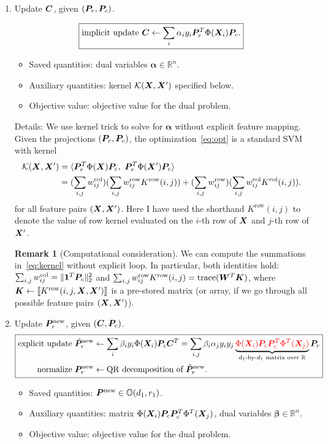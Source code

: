 \documentclass[11pt]{article}
\theoremstyle{plain}
\theoremstyle{definition}
\newtheorem{rmk}{Remark}
\newcommand*{\KeepStyleUnderBrace}[1]{%
  \mathop{%
    \mathchoice
    {\underbrace{\displaystyle#1}}%
    {\underbrace{\textstyle#1}}%
    {\underbrace{\scriptstyle#1}}%
    {\underbrace{\scriptscriptstyle#1}}%
  }\limits
}
\begin{document}
\begin{enumerate}
\item Update $\bm C$, given $(\bm{P}_r, \bm{P}_c)$. 

\[
\boxed{
\text{implicit update }\bm C\leftarrow \sum_{i}\alpha_iy_i\bm{P}^T_r\Phi(\bm X_i)\bm{P}_c.
}
\]
\begin{itemize}
\item Saved quantities: dual variables $\boldsymbol{\alpha}\in\mathbb{R}^n$.
\item Auxiliary  quantities: kernel $\mathcal{K}(\bm X,\bm X')$ specified below.
\item Objective value: objective value for the dual problem. 
\end{itemize}

Details:  We use kernel trick to solve for $\boldsymbol{\alpha}$ without explicit feature mapping. Given the projections $(\bm{P}_r, \bm{P}_c)$, the optimization~\eqref{eq:opt} is a standard SVM with kernel
\begin{align}\label{eq:kernel}
\mathcal{K}(\bm X,\bm X')&=\langle \bm{P}^T_r\Phi(\bm X)\bm{P}_c,\ \bm{P}^T_r\Phi(\bm X')\bm{P}_c\rangle\notag\\
&= (\sum_{i,j}w^{\text{col}}_{ij})( \sum_{i,j} w^{\text{row}}_{ij}K^{\text{row}}(i,j))+(\sum_{i,j}w^{\text{row}}_{ij})( \sum_{i,j} w^{\text{col}}_{ij}K^{\text{col}}(i,j)).
\end{align}
for all feature pairs $(\bm X,\bm X')$. Here I have used the shorthand $K^{\text{row}}(i,j)$ to denote the value of row kernel evaluated on the $i$-th row of $\bm X$ and $j$-th row of $\bm X'$. 

\begin{rmk}[Computational consideration]
We can compute the summations in~\eqref{eq:kernel} without explicit loop. In particular, both identities hold: $\sum_{i,j}w^{\text{col}}_{ij}=\lVert\mathbf{1}^T\bm{P}_c\rVert_2^2$ and $\sum_{i,j} w^{\text{row}}_{ij}K^{\text{row}}(i,j)=\text{trace}(\bm{W}^T\bm K)$, where $\bm K\leftarrow \llbracket K^{\text{row}}(i,j,\bm X,\bm X') \rrbracket$ is a pre-stored matrix (or array, if we go through all possible feature pairs $(\bm X,\bm X')$).
\end{rmk}

\item Update $\bm{P}^{\text{new}}_r$, given $(\bm C, \bm{P}_c)$. 
\[
\boxed{
\begin{aligned}
\text{explicit update }\tilde \mP^{\text{new}}_r&\leftarrow \sum_{i}\beta_iy_i \Phi(\mX_i)\mP_c\mC^T=\sum_{i,j}\beta_i\alpha_jy_i y_j \KeepStyleUnderBrace{\color{red}\Phi(\mX_i)\mP_c\mP^T_c\Phi^T(\mX_j)}_{\text{$d_1$-by-$d_1$ matrix over $\mathbb{R}$}}\mP_r\\
\text{normalize } \mP^{\text{new}}_r &\leftarrow \text{QR decomposition of $\tilde \mP^{\text{new}}_r$}.
\end{aligned}
}
\]
\begin{itemize}
\item Saved quantities: $\bm{P}^{\text{new}}\in\mathbb{O}(d_1,r_1)$.
\item Auxiliary quantities: matrix $\Phi(\bm X_i)\bm{P}_c\bm{P}^T_c\Phi^T(\bm X_j)$, dual variables $\boldsymbol{\beta}\in\mathbb{R}^n$.
\item Objective value: objective value for the dual problem. 
\end{itemize}


\end{enumerate}
\end{document}
